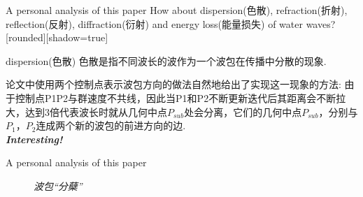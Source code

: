 \documentclass{beamer}
\begin{document}
\begin{frame}{A personal analysis of this paper}
  How about dispersion(色散), refraction(折射), reflection(反射), diffraction(衍射) and energy loss(能量损失) of water waves?
  [rounded][shadow=true]
  \begin{block}{dispersion(色散)}
    色散是指不同波长的波作为一个波包在传播中分散的现象.
  \end{block}
  \par 论文中使用两个控制点表示波包方向的做法自然地给出了实现这一现象的方法: 由于控制点P1P2与群速度不共线，因此当P1和P2不断更新迭代后其距离会不断拉大，达到3倍代表波长时就从几何中点$P_{sub}$处会分离，它们的几何中点$P_{sub}$，分别与$P_1$，$P_2$连成两个新的波包的前进方向的边.
  \\ \emph{\large \centering \textbf{\textcolor[rgb]{0,0,1}{Interesting!}}}
\end{frame}
\begin{frame}{A personal analysis of this paper}
  \begin{figure}[thpb]
    \centering
    \caption*{\emph{波包“分蘖”}}
  \label{fig:system}
  \end{figure}
\end{frame}
\end{document}
